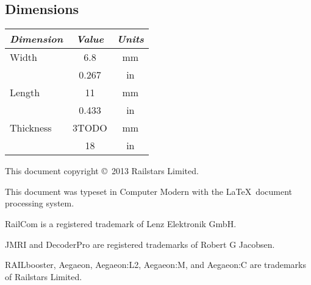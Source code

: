 \documentclass[12pt,letterpaper,draft]{memoir} %
\begin{document}
\subsection*{Dimensions}

\begin{center}
\begin{tabular}{|l|c|c|}
\hline
\textit{Dimension} & \textit{Value} & \textit{Units}\\ \hline
Width & 6.8 & mm \\
       &0.267 & in \\ \hline
Length & 11 & mm \\
       & 0.433 & in \\ \hline
Thickness & 3TODO & mm \\
          & 18 & in \\ \hline
\end{tabular}
\end{center}

\printindex

\newpage

This document copyright \copyright \ 2013 Railstars Limited.

This document was typeset in Computer Modern with the \LaTeX \ document processing system.

RailCom\textsuperscript{\textregistered} is a registered trademark of Lenz Elektronik GmbH.

JMRI\textsuperscript{\textregistered} and DecoderPro\textsuperscript{\textregistered} are registered trademarks of Robert G Jacobsen.

RAILbooster\textsuperscript{\texttrademark}, Aegaeon\textsuperscript{\texttrademark}, Aegaeon:L2\textsuperscript{\texttrademark}, Aegaeon:M\textsuperscript{\texttrademark}, and Ae\-gae\-on:C\textsuperscript{\texttrademark}  are trademarks of Railstars Limited.
\end{document}
